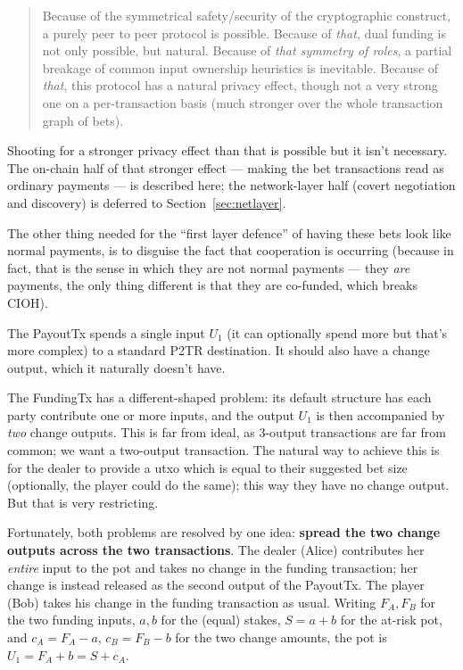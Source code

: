 \documentclass[11pt]{article}
\begin{document}
\begin{quotation}
Because of the symmetrical safety/security of the cryptographic construct, a purely peer to peer protocol is possible. Because of \emph{that}, dual funding is not only possible, but natural. Because of \emph{that symmetry of roles}, a partial breakage of common input ownership heuristics \cite{fistful} is inevitable. Because of \emph{that}, this protocol has a natural privacy effect, though not a very strong one on a per-transaction basis (much stronger over the whole transaction graph of bets).
\end{quotation}

Shooting for a stronger privacy effect than that is possible but it isn't necessary. The on-chain half of that stronger effect --- making the bet transactions read as ordinary payments --- is described here; the network-layer half (covert negotiation and discovery) is deferred to Section~\ref{sec:netlayer}.

The other thing needed for the ``first layer defence'' of having these bets look like normal payments, is to disguise the fact that cooperation is occurring (because in fact, that is the sense in which they are not normal payments --- they \emph{are} payments, the only thing different is that they are co-funded, which breaks CIOH).

The PayoutTx spends a single input $U_1$ (it can optionally spend more but that's more complex) to a standard P2TR destination. It should also have a change output, which it naturally doesn't have.

The FundingTx has a different-shaped problem: its default structure has each party contribute one or more inputs, and the output $U_1$ is then accompanied by \emph{two} change outputs. This is far from ideal, as 3-output transactions are far from common; we want a two-output transaction. The natural way to achieve this is for the dealer to provide a utxo which is equal to their suggested bet size (optionally, the player could do the same); this way they have no change output. But that is very restricting.

Fortunately, both problems are resolved by one idea: \textbf{spread the two change outputs across the two transactions}. The dealer (Alice) contributes her \emph{entire} input to the pot and takes no change in the funding transaction; her change is instead released as the second output of the PayoutTx. The player (Bob) takes his change in the funding transaction as usual. Writing $F_A, F_B$ for the two funding inputs, $a,b$ for the (equal) stakes, $S = a+b$ for the at-risk pot, and $c_A = F_A - a$, $c_B = F_B - b$ for the two change amounts, the pot is $U_1 = F_A + b = S + c_A$.
\end{document}
